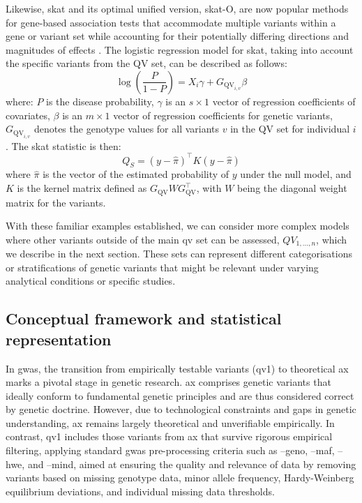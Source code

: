 Likewise, \ac{skat} and its optimal unified version, \ac{skat}-O, are now popular methods for gene-based association tests that accommodate multiple variants within a gene or variant set while accounting for their potentially differing directions and magnitudes of effects
\cite{wu2011rare, lee2012optimal}. 
The logistic regression model for \ac{skat}, taking into account the specific variants from the QV set, can be described as follows:
$$
\log \left( \frac{P}{1-P} \right) = X_i \gamma + G_{\text{QV}_{i,v}} \beta
$$
where:
\( P \) is the disease probability,
\( \gamma \) is an \( s \times 1 \) vector of regression coefficients of covariates,
\( \beta \) is an \( m \times 1 \) vector of regression coefficients for genetic variants,
\( G_{\text{QV}_{i,v}} \) denotes the genotype values for all variants \( v \) in the QV set for individual \( i \).
The \ac{skat} statistic is then:
$$
Q_S = (y - \hat{\pi})^\top K (y - \hat{\pi})
$$
where \( \hat{\pi} \) is the vector of the estimated probability of \( y \) under the null model, and \( K \) is the kernel matrix defined as \( G_{\text{QV}} W G_{\text{QV}}^\top \), with \( W \) being the diagonal weight matrix for the variants.

With these familiar examples established, we can consider more complex models where other variants outside of the main \ac{qv} set can be assessed,  $QV_{1,...,n} $,
which we describe in the next section. 
These sets can represent different categorisations or stratifications of genetic variants that might be relevant under varying analytical conditions or specific studies.

\subsection{Conceptual framework and statistical representation}

In \ac{gwas}, the transition from empirically testable variants (\ac{qv}1) to theoretical \ac{ax} marks a pivotal stage in genetic research.
\ac{ax} comprises genetic variants that ideally conform to fundamental genetic principles and are thus considered correct by genetic doctrine. 
However, due to technological constraints and gaps in genetic understanding, \ac{ax} remains largely theoretical and unverifiable empirically. 
In contrast, \ac{qv}1 includes those variants from \ac{ax} that survive rigorous empirical filtering, applying standard \ac{gwas} pre-processing criteria such as --geno, --maf, --hwe, and --mind, aimed at ensuring the quality and relevance of data by removing variants based on missing genotype data, minor allele frequency, Hardy-Weinberg equilibrium deviations, and individual missing data thresholds.

